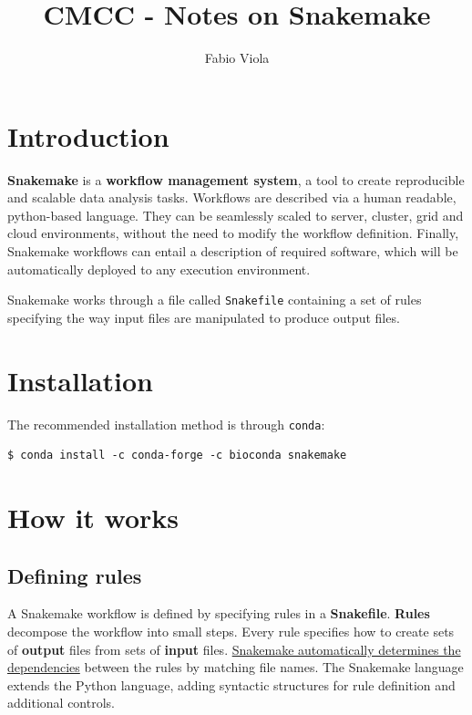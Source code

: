 \documentclass[10pt]{article}
\title{CMCC - Notes on Snakemake}
\author{Fabio Viola}
\date{}
\begin{document}
\maketitle
\tableofcontents
\newpage

\section{Introduction}

\textbf{Snakemake} is a \textbf{workflow management system}, a tool to create reproducible and scalable data analysis tasks. Workflows are described via a human readable, python-based language. They can be seamlessly scaled to server, cluster, grid and cloud environments, without the need to modify the workflow definition. Finally, Snakemake workflows can entail a description of required software, which will be automatically deployed to any execution environment.

Snakemake works through a file called \texttt{Snakefile} containing a set of rules specifying the way input files are manipulated to produce output files.

\section{Installation}

The recommended installation method is through \texttt{conda}:

\begin{lstlisting}[style=mybash]
$ conda install -c conda-forge -c bioconda snakemake    
\end{lstlisting}

\section{How it works}

\subsection{Defining rules}

A Snakemake workflow is defined by specifying rules in a \textbf{Snakefile}. \textbf{Rules} decompose the workflow into small steps. Every rule specifies how to create sets of \textbf{output} files from sets of \textbf{input} files. \ul{Snakemake automatically determines the dependencies} between the rules by matching file names. The Snakemake language extends the Python language, adding syntactic structures for rule definition and additional controls. 
\end{document}
